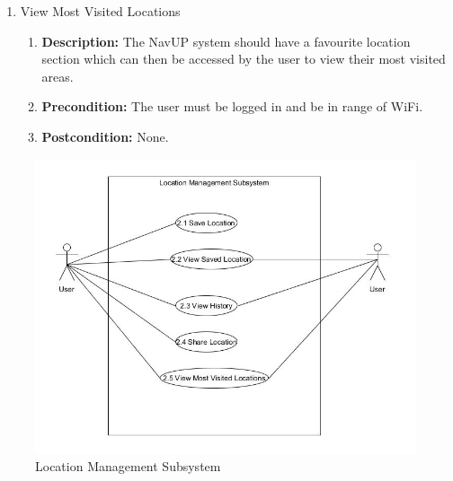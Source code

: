 \documentclass{article}
\begin{document}
\begin{enumerate}
\begin{enumerate}
		\item View Most Visited Locations  
		\begin{enumerate}
			\item \textbf{Description:} The NavUP system should have a favourite location section which can then be accessed by the user to view their most visited areas. 
			\item \textbf{Precondition:} The user must be logged in and be in range of WiFi.
			\item \textbf{Postcondition:} None.\newline
		\end{enumerate}
	\end{enumerate}
	\begin{figure}[H]
		\includegraphics[scale=0.5]{Location_Management.JPG}
		\caption{Location Management Subsystem}	
	\end{figure}
	

\end{enumerate}
\end{document}
